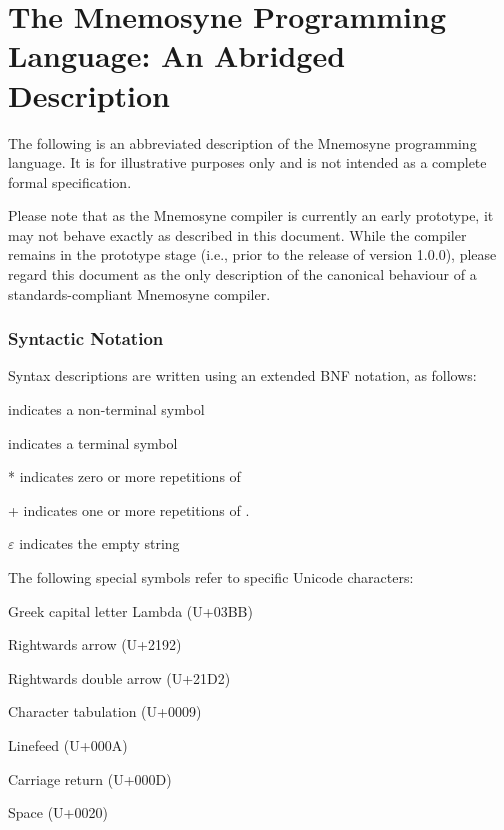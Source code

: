 %

\chapter{The Mnemosyne Programming Language: An Abridged Description}\label{app:spec}
\setlength{\grammarindent}{6em}

The following is an abbreviated description of the Mnemosyne programming language. It is for illustrative purposes only and is not intended as a complete formal specification.

Please note that as the Mnemosyne compiler is currently an early prototype, it may not behave exactly as described in this document. While the compiler remains in the prototype stage (i.e., prior to the release of version 1.0.0), please regard this document as the only description of the canonical behaviour of a standards-compliant Mnemosyne compiler.

\subsection{Syntactic Notation}
Syntax descriptions are written using an extended BNF notation, as follows:
\begin{description}
    \item{} indicates a non-terminal symbol
    \item{} indicates a terminal symbol
    \item{* } indicates zero or more repetitions of 
    \item{+} indicates one or more repetitions of .
    \item{$\varepsilon$} indicates the empty string
\end{description}

The following special symbols refer to specific Unicode characters:
\begin{description}
    \item{} Greek capital letter Lambda (U+03BB)
    \item{} Rightwards arrow (U+2192)
    \item{} Rightwards double arrow (U+21D2)
    \item{} Character tabulation (U+0009)
    \item{} Linefeed (U+000A)
    \item{} Carriage return (U+000D)
    \item{} Space (U+0020)
\end{description}

